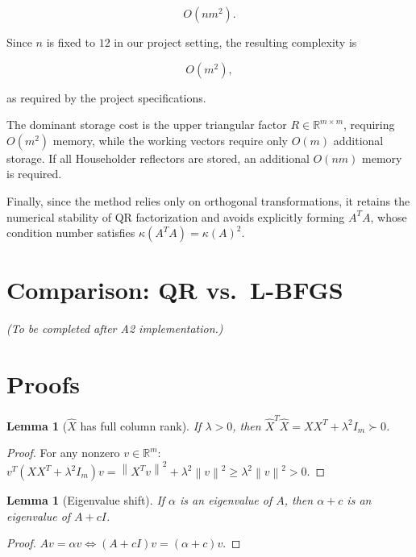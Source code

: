 \documentclass[11pt,a4paper]{article}
\newtheorem{lemma}[theorem]{Lemma}
\newcommand{\R}{\mathbb{R}}
\newcommand{\norm}[1]{\left\|#1\right\|}
\newcommand{\Xhat}{\hat{X}}
\begin{document}
\begin{equation}
    O(nm^2).
\end{equation}

Since $n$ is fixed to $12$ in our project setting, the resulting complexity is

\begin{equation}
    O(m^2),
\end{equation}

as required by the project specifications.

The dominant storage cost is the upper triangular factor $R\in\R^{m\times m}$, requiring $O(m^2)$ memory, while the working vectors require only $O(m)$ additional storage. If all Householder reflectors are stored, an additional $O(nm)$ memory is required.

Finally, since the method relies only on orthogonal transformations, it retains the numerical stability of QR factorization and avoids explicitly forming $A^TA$, whose condition number satisfies $\kappa(A^TA)=\kappa(A)^2$.

\section{Comparison: QR vs.\ L-BFGS}
\label{sec:comparison}

\textit{(To be completed after A2 implementation.)}


\appendix
\section{Proofs}

\begin{lemma}[$\Xhat$ has full column rank]
\label{lemma:fullrank}
If $\lambda > 0$, then $\Xhat^T\Xhat = XX^T + \lambda^2 I_m \succ 0$.
\end{lemma}
\begin{proof}
For any nonzero $v \in \R^m$:
$v^T(XX^T + \lambda^2 I_m)v = \norm{X^T v}^2 + \lambda^2\norm{v}^2 \geq \lambda^2\norm{v}^2 > 0.$
\end{proof}

\begin{lemma}[Eigenvalue shift]
\label{lemma:eigenvalues}
If $\alpha$ is an eigenvalue of $A$, then $\alpha + c$ is an eigenvalue of $A + cI$.
\end{lemma}
\begin{proof}
$Av = \alpha v \iff (A + cI)v = (\alpha + c)v.$
\end{proof}
\end{document}
